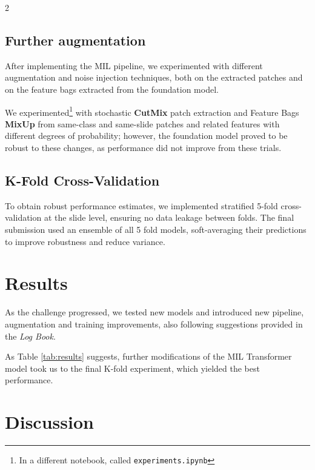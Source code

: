\documentclass[11pt]{article}
\begin{document}
\begin{multicols}{2}
        \vspace{-4mm}
        \subsection{Further augmentation}
        \vspace{-2mm}

        After implementing the MIL pipeline, we experimented with different augmentation and noise injection techniques, both on the extracted patches and on the feature bags extracted from the foundation model.

        We experimented\footnote{In a different notebook, called \texttt{experiments.ipynb}} with stochastic \textbf{CutMix} patch extraction and Feature Bags \textbf{MixUp} from same-class and same-slide patches and related features with different degrees of probability; however, the foundation model proved to be robust to these changes, as performance did not improve from these trials. 
        \vspace{-5mm}
        \subsection{K-Fold Cross-Validation}
        \vspace{-2mm}

        To obtain robust performance estimates, we implemented stratified 5-fold cross-validation at the slide level, ensuring no data leakage between folds. The final submission used an ensemble of all 5 fold models, soft-averaging their predictions to improve robustness and reduce variance.
        
        \vspace{-5mm}
        \section{Results}
        \vspace{-2mm}
        As the challenge progressed, we tested new models and introduced new pipeline, augmentation and training improvements, also following suggestions provided in the \textit{Log Book}. 

        As Table \ref{tab:results} suggests, further modifications of the MIL Transformer model took us to the final K-fold experiment, which yielded the best performance. 

        \vspace{-4mm}
        \section{Discussion}
        \vspace{-2mm}


\end{multicols}
\end{document}
